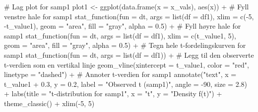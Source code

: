 \documentclass[
  letterpaper,
  DIV=11,
  numbers=noendperiod]{scrreprt}
\newenvironment{Shaded}{\begin{snugshade}}{\end{snugshade}}
\newcommand{\AttributeTok}[1]{\textcolor[rgb]{0.40,0.45,0.13}{#1}}
\newcommand{\CommentTok}[1]{\textcolor[rgb]{0.37,0.37,0.37}{#1}}
\newcommand{\DecValTok}[1]{\textcolor[rgb]{0.68,0.00,0.00}{#1}}
\newcommand{\FloatTok}[1]{\textcolor[rgb]{0.68,0.00,0.00}{#1}}
\newcommand{\FunctionTok}[1]{\textcolor[rgb]{0.28,0.35,0.67}{#1}}
\newcommand{\NormalTok}[1]{\textcolor[rgb]{0.00,0.23,0.31}{#1}}
\newcommand{\OtherTok}[1]{\textcolor[rgb]{0.00,0.23,0.31}{#1}}
\newcommand{\SpecialCharTok}[1]{\textcolor[rgb]{0.37,0.37,0.37}{#1}}
\newcommand{\StringTok}[1]{\textcolor[rgb]{0.13,0.47,0.30}{#1}}
\begin{document}
\begin{Shaded}
\begin{Highlighting}[]
\CommentTok{\# Lag plot for samp1}
\NormalTok{plot1 }\OtherTok{\textless{}{-}} \FunctionTok{ggplot}\NormalTok{(}\FunctionTok{data.frame}\NormalTok{(}\AttributeTok{x =}\NormalTok{ x\_vals), }\FunctionTok{aes}\NormalTok{(x)) }\SpecialCharTok{+}
  \CommentTok{\# Fyll venstre hale for samp1}
  \FunctionTok{stat\_function}\NormalTok{(}\AttributeTok{fun =}\NormalTok{ dt, }\AttributeTok{args =} \FunctionTok{list}\NormalTok{(}\AttributeTok{df =}\NormalTok{ df1), }\AttributeTok{xlim =} \FunctionTok{c}\NormalTok{(}\SpecialCharTok{{-}}\DecValTok{5}\NormalTok{, }\SpecialCharTok{{-}}\NormalTok{t\_value1), }\AttributeTok{geom =} \StringTok{"area"}\NormalTok{, }\AttributeTok{fill =} \StringTok{"gray"}\NormalTok{, }\AttributeTok{alpha =} \FloatTok{0.5}\NormalTok{) }\SpecialCharTok{+}
  \CommentTok{\# Fyll høyre hale for samp1}
  \FunctionTok{stat\_function}\NormalTok{(}\AttributeTok{fun =}\NormalTok{ dt, }\AttributeTok{args =} \FunctionTok{list}\NormalTok{(}\AttributeTok{df =}\NormalTok{ df1), }\AttributeTok{xlim =} \FunctionTok{c}\NormalTok{(t\_value1, }\DecValTok{5}\NormalTok{), }\AttributeTok{geom =} \StringTok{"area"}\NormalTok{, }\AttributeTok{fill =} \StringTok{"gray"}\NormalTok{, }\AttributeTok{alpha =} \FloatTok{0.5}\NormalTok{) }\SpecialCharTok{+}
  \CommentTok{\# Tegn hele t{-}fordelingskurven for samp1}
  \FunctionTok{stat\_function}\NormalTok{(}\AttributeTok{fun =}\NormalTok{ dt, }\AttributeTok{args =} \FunctionTok{list}\NormalTok{(}\AttributeTok{df =}\NormalTok{ df1)) }\SpecialCharTok{+}
  \CommentTok{\# Legg til den observerte t{-}verdien som en vertikal linje}
  \FunctionTok{geom\_vline}\NormalTok{(}\AttributeTok{xintercept =}\NormalTok{ t\_value1, }\AttributeTok{color =} \StringTok{"red"}\NormalTok{, }\AttributeTok{linetype =} \StringTok{"dashed"}\NormalTok{) }\SpecialCharTok{+}
  \CommentTok{\# Annoter t{-}verdien for samp1}
  \FunctionTok{annotate}\NormalTok{(}\StringTok{"text"}\NormalTok{, }\AttributeTok{x =}\NormalTok{ t\_value1 }\SpecialCharTok{+} \FloatTok{0.3}\NormalTok{, }\AttributeTok{y =} \FloatTok{0.2}\NormalTok{, }\AttributeTok{label =} \StringTok{"Observed t (samp1)"}\NormalTok{, }\AttributeTok{angle =} \SpecialCharTok{{-}}\DecValTok{90}\NormalTok{, }\AttributeTok{size =} \FloatTok{2.8}\NormalTok{) }\SpecialCharTok{+}
  \FunctionTok{labs}\NormalTok{(}\AttributeTok{title =} \StringTok{"t{-}distribution for samp1"}\NormalTok{, }\AttributeTok{x =} \StringTok{"t"}\NormalTok{, }\AttributeTok{y =} \StringTok{"Density f(t)"}\NormalTok{) }\SpecialCharTok{+}
  \FunctionTok{theme\_classic}\NormalTok{() }\SpecialCharTok{+}
  \FunctionTok{xlim}\NormalTok{(}\SpecialCharTok{{-}}\DecValTok{5}\NormalTok{, }\DecValTok{5}\NormalTok{)}


\end{Highlighting}
\end{Shaded}
\end{document}
